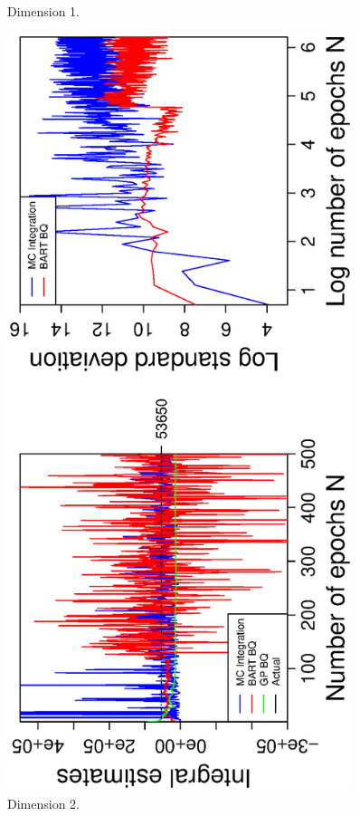 \begin{figure}[H]
\begin{minipage}[b]{0.4\textwidth}
     \vspace{-1cm}
     \caption{Dimension 1.}
  \end{minipage}
    \hspace{1.5cm}
  \begin{minipage}[b]{0.4\textwidth}
    \includegraphics[width= 0.9\textwidth, angle = -90]{report/Figures/6/convergenceMean62Dimensions.eps}
    \vspace{-1cm}
    \caption{Dimension 2.}
  \end{minipage}
\end{figure}
\vspace{-1cm}

